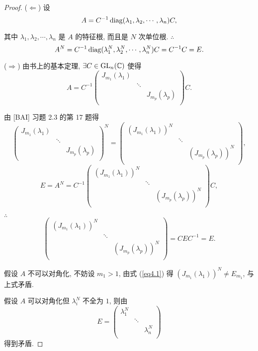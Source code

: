 \documentclass[color=black,device=normal,lang=cn,mode=geye]{elegantnote}
\begin{document}
\begin{proof}
    ($\Leftarrow$) 设
    \[A=C^{-1}\operatorname{diag} (\lambda_1,\lambda_2,\cdots,\lambda_n)C,\]

    其中 $\lambda_1,\lambda_2,\cdots,\lambda_n$ 是 $A$ 的特征根, 而且是 $N$ 次单位根. $\therefore$
    \[A^N=C^{-1}\operatorname{diag} (\lambda_1^N,\lambda_2^N,\cdots,\lambda_n^N)C=C^{-1}C=E.\]

    ($\Rightarrow$) 由书上的基本定理, $\exists C\in\operatorname{GL} _n(\mathbb{C})$ 使得
    \[A=C^{-1}\begin{pmatrix}
        J_{m_1}(\lambda_1) \\
        & \ddots \\
        && J_{m_p}(\lambda_p) \\
    \end{pmatrix}C.\]

    由 [BAI] 习题 2.3 的第 17 题得
    \[\begin{pmatrix}
        J_{m_1}(\lambda_1) \\
        & \ddots \\
        && J_{m_p}(\lambda_p) \\
    \end{pmatrix}^N=\begin{pmatrix}
        (J_{m_1}(\lambda_1))^N \\
        & \ddots \\
        && (J_{m_p}(\lambda_p))^N \\
    \end{pmatrix},\]
    \[E=A^N=C^{-1}\begin{pmatrix}
        (J_{m_1}(\lambda_1))^N \\
        & \ddots \\
        && (J_{m_p}(\lambda_p))^N \\
    \end{pmatrix}C,\]

    $\therefore$
    \[\begin{pmatrix}
        (J_{m_1}(\lambda_1))^N \\
        & \ddots \\
        && (J_{m_p}(\lambda_p))^N \\
    \end{pmatrix}=CEC^{-1}=E.\]

    假设 $A$ 不可以对角化, 不妨设 $m_1>1$, 由式 (\ref{eq4.1}) 得 $(J_{m_1}(\lambda_1))^N\neq E_{m_1}$, 与上式矛盾.

    假设 $A$ 可以对角化但 $\lambda_i^N$ 不全为 $1$, 则由
    \[E=\begin{pmatrix}
        \lambda_1^N \\
        & \ddots \\
        && \lambda_n^N \\
    \end{pmatrix}\]
    得到矛盾.
\end{proof}
\end{document}
